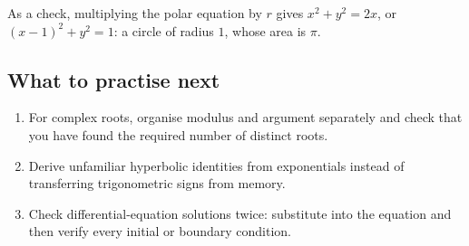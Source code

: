 \documentclass[10pt,a4paper]{article}
\begin{document}
As a check, multiplying the polar equation by \(r\) gives \(x^2+y^2=2x\), or \((x-1)^2+y^2=1\): a circle of radius \(1\), whose area is \(\pi\).

\subsection*{What to practise next}\begin{enumerate}
\item For complex roots, organise modulus and argument separately and check that you have found the required number of distinct roots.
\item Derive unfamiliar hyperbolic identities from exponentials instead of transferring trigonometric signs from memory.
\item Check differential-equation solutions twice: substitute into the equation and then verify every initial or boundary condition.
\end{enumerate}
\end{document}
